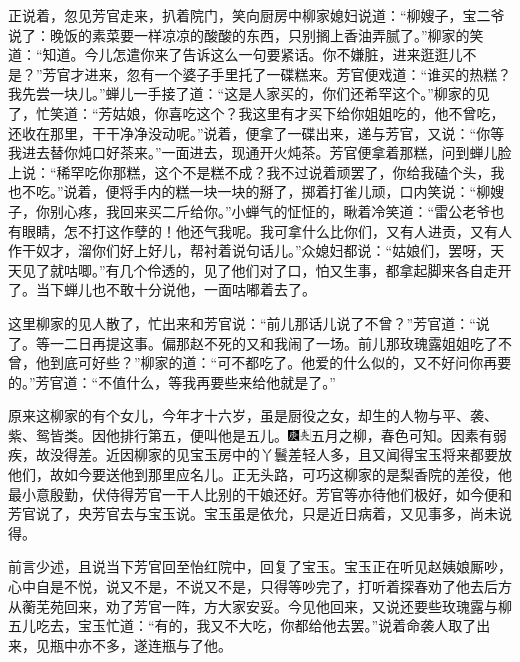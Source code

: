 正说着，忽见芳官走来，扒着院门，笑向厨房中柳家媳妇说道：“柳嫂子，宝二爷说了：晚饭的素菜要一样凉凉的酸酸的东西，只别搁上香油弄腻了。”柳家的笑道：“知道。今儿怎遣你来了告诉这么一句要紧话。你不嫌脏，进来逛逛儿不是？”芳官才进来，忽有一个婆子手里托了一碟糕来。芳官便戏道：“谁买的热糕？我先尝一块儿。”蝉儿一手接了道：“这是人家买的，你们还希罕这个。”柳家的见了，忙笑道：“芳姑娘，你喜吃这个？我这里有才买下给你姐姐吃的，他不曾吃，还收在那里，干干净净没动呢。”说着，便拿了一碟出来，递与芳官，又说：“你等我进去替你炖口好茶来。”一面进去，现通开火炖茶。芳官便拿着那糕，问到蝉儿脸上说：“稀罕吃你那糕，这个不是糕不成？我不过说着顽罢了，你给我磕个头，我也不吃。”说着，便将手内的糕一块一块的掰了，掷着打雀儿顽，口内笑说：“柳嫂子，你别心疼，我回来买二斤给你。”小蝉气的怔怔的，瞅着冷笑道：“雷公老爷也有眼睛，怎不打这作孽的！他还气我呢。我可拿什么比你们，又有人进贡，又有人作干奴才，溜你们好上好儿，帮衬着说句话儿。”众媳妇都说：“姑娘们，罢呀，天天见了就咕唧。”有几个伶透的，见了他们对了口，怕又生事，都拿起脚来各自走开了。当下蝉儿也不敢十分说他，一面咕嘟着去了。

这里柳家的见人散了，忙出来和芳官说：“前儿那话儿说了不曾？”芳官道：“说了。等一二日再提这事。偏那赵不死的又和我闹了一场。前儿那玫瑰露姐姐吃了不曾，他到底可好些？”柳家的道：“可不都吃了。他爱的什么似的，又不好问你再要的。”芳官道：“不值什么，等我再要些来给他就是了。”

原来这柳家的有个女儿，今年才十六岁，虽是厨役之女，却生的人物与平、袭、紫、鸳皆类。因他排行第五，便叫他是五儿。{\includegraphics[width=3mm]{../Images/00004}\includegraphics[width=3mm]{../Images/00012}\footnotesize \kaishu 五月之柳，春色可知。}因素有弱疾，故没得差。近因柳家的见宝玉房中的丫鬟差轻人多，且又闻得宝玉将来都要放他们，故如今要送他到那里应名儿。正无头路，可巧这柳家的是梨香院的差役，他最小意殷勤，伏侍得芳官一干人比别的干娘还好。芳官等亦待他们极好，如今便和芳官说了，央芳官去与宝玉说。宝玉虽是依允，只是近日病着，又见事多，尚未说得。

前言少述，且说当下芳官回至怡红院中，回复了宝玉。宝玉正在听见赵姨娘厮吵，心中自是不悦，说又不是，不说又不是，只得等吵完了，打听着探春劝了他去后方从蘅芜苑回来，劝了芳官一阵，方大家安妥。今见他回来，又说还要些玫瑰露与柳五儿吃去，宝玉忙道：“有的，我又不大吃，你都给他去罢。”说着命袭人取了出来，见瓶中亦不多，遂连瓶与了他。

